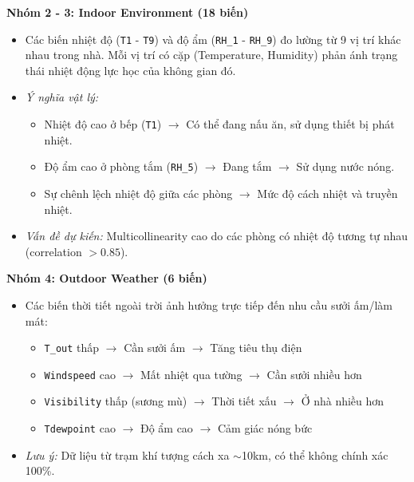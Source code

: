 \textbf{Nhóm 2 - 3: Indoor Environment (18 biến)}
\begin{itemize} [labelsep=10pt, leftmargin=2cm]
    \item Các biến nhiệt độ (\texttt{T1} - \texttt{T9}) và độ ẩm (\texttt{RH\_1} - \texttt{RH\_9}) đo lường từ 9 vị trí khác nhau trong nhà. Mỗi vị trí có cặp (Temperature, Humidity) phản ánh trạng thái nhiệt động lực học của không gian đó.
    
    \item \textit{Ý nghĩa vật lý:}
    \begin{itemize}
        \item[$\circ$] Nhiệt độ cao ở bếp (\texttt{T1}) $\rightarrow$ Có thể đang nấu ăn, sử dụng thiết bị phát nhiệt.
        \item[$\circ$] Độ ẩm cao ở phòng tắm (\texttt{RH\_5}) $\rightarrow$ Đang tắm $\rightarrow$ Sử dụng nước nóng.
        \item[$\circ$] Sự chênh lệch nhiệt độ giữa các phòng $\rightarrow$ Mức độ cách nhiệt và truyền nhiệt.
    \end{itemize}
    
    \item \textit{Vấn đề dự kiến:} Multicollinearity cao do các phòng có nhiệt độ tương tự nhau (correlation $> 0.85$).
\end{itemize}

\textbf{Nhóm 4: Outdoor Weather (6 biến)}
\begin{itemize} [labelsep=10pt, leftmargin=2cm]
    \item Các biến thời tiết ngoài trời ảnh hưởng trực tiếp đến nhu cầu sưởi ấm/làm mát:
    \begin{itemize}
        \item[$\circ$] \texttt{T\_out} thấp $\rightarrow$ Cần sưởi ấm $\rightarrow$ Tăng tiêu thụ điện
        \item[$\circ$] \texttt{Windspeed} cao $\rightarrow$ Mất nhiệt qua tường $\rightarrow$ Cần sưởi nhiều hơn
        \item[$\circ$] \texttt{Visibility} thấp (sương mù) $\rightarrow$ Thời tiết xấu $\rightarrow$ Ở nhà nhiều hơn
        \item[$\circ$] \texttt{Tdewpoint} cao $\rightarrow$ Độ ẩm cao $\rightarrow$ Cảm giác nóng bức
    \end{itemize}
    
    \item \textit{Lưu ý:} Dữ liệu từ trạm khí tượng cách xa $\sim$10km, có thể không chính xác 100\%.
\end{itemize}

